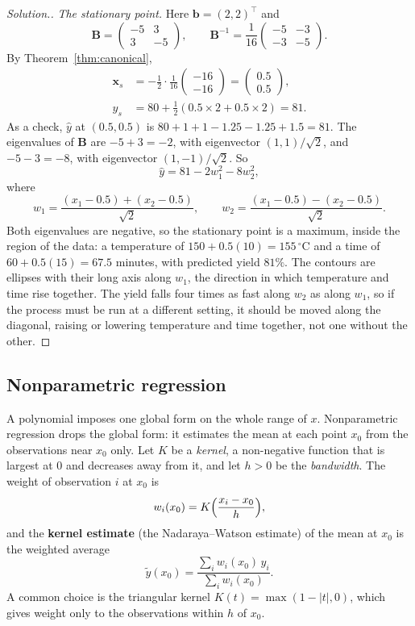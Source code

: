 \documentclass[11pt,a4paper]{article}
\numberwithin{equation}{section}
\theoremstyle{definition}
\newenvironment{solution}
  {\renewcommand{\qedsymbol}{}\begin{proof}[\textit{Solution}.]}
  {\end{proof}}
\begin{document}
\begin{solution}
\emph{The stationary point.} Here $\mathbf{b} = (2, 2)^\top$ and
\[
\mathbf{B} = \begin{pmatrix} -5 & 3 \\ 3 & -5 \end{pmatrix}, \qquad
\mathbf{B}^{-1} = \frac{1}{16}\begin{pmatrix} -5 & -3 \\ -3 & -5 \end{pmatrix} .
\]
By Theorem~\ref{thm:canonical},
\begin{align*}
\mathbf{x}_s &= -\frac12\cdot\frac{1}{16}\begin{pmatrix} -16 \\ -16 \end{pmatrix} = \begin{pmatrix} 0.5 \\ 0.5 \end{pmatrix} , \\
\hat y_s &= 80 + \tfrac12(0.5 \times 2 + 0.5 \times 2) = 81 .
\end{align*}
As a check, $\hat y$ at $(0.5, 0.5)$ is $80 + 1 + 1 - 1.25 - 1.25 + 1.5 = 81$. The eigenvalues of $\mathbf{B}$ are $-5 + 3 = -2$, with
eigenvector $(1, 1)/\sqrt2$, and $-5 - 3 = -8$, with eigenvector $(1, -1)/\sqrt2$. So
\[
\hat y = 81 - 2w_1^2 - 8w_2^2 ,
\]
where
\[
w_1 = \frac{(x_1 - 0.5) + (x_2 - 0.5)}{\sqrt2}, \qquad w_2 = \frac{(x_1 - 0.5) - (x_2 - 0.5)}{\sqrt2} .
\]
Both eigenvalues are negative, so the stationary point is a maximum, inside the region of the data: a
temperature of $150 + 0.5(10) = 155\,^\circ$C and a time of $60 + 0.5(15) = 67.5$ minutes, with predicted yield $81\%$. The
contours are ellipses with their long axis along $w_1$, the direction in which temperature and time rise
together. The yield falls four times as fast along $w_2$ as along $w_1$, so if the process must be run at a
different setting, it should be moved along the diagonal, raising or lowering temperature and time
together, not one without the other.
\end{solution}

\subsection{Nonparametric regression}
A polynomial imposes one global form on the whole range of $x$. Nonparametric regression drops the global
form: it estimates the mean at each point $x_0$ from the observations near $x_0$ only. Let $K$ be a
\emph{kernel}, a non-negative function that is largest at $0$ and decreases away from it, and let $h > 0$ be the
\emph{bandwidth}. The weight of observation $i$ at $x_0$ is
\[
w_i(x_0) = K\Bigl(\frac{x_i - x_0}{h}\Bigr) ,
\]
and the \textbf{kernel estimate} (the Nadaraya--Watson estimate) of the mean at $x_0$ is the weighted average
\[
\tilde y(x_0) = \frac{\sum_i w_i(x_0)\,y_i}{\sum_i w_i(x_0)} .
\]
A common choice is the triangular kernel $K(t) = \max(1 - |t|, 0)$, which gives weight only to the observations
within $h$ of $x_0$.
\end{document}
